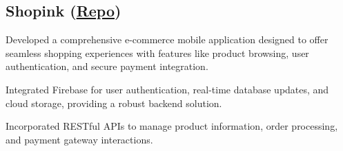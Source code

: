 \subsection{Shopink (\href{https://github.com/Allam-dev/TEKNOSOFT}{Repo})}
\begin{zitemize}
\item Developed a comprehensive e-commerce mobile application designed to offer seamless shopping experiences with features like product browsing, user authentication, and secure payment integration.
\item Integrated Firebase for user authentication, real-time database updates, and cloud storage, providing a robust backend solution.
\item Incorporated RESTful APIs to manage product information, order processing, and payment gateway interactions.
\end{zitemize}


